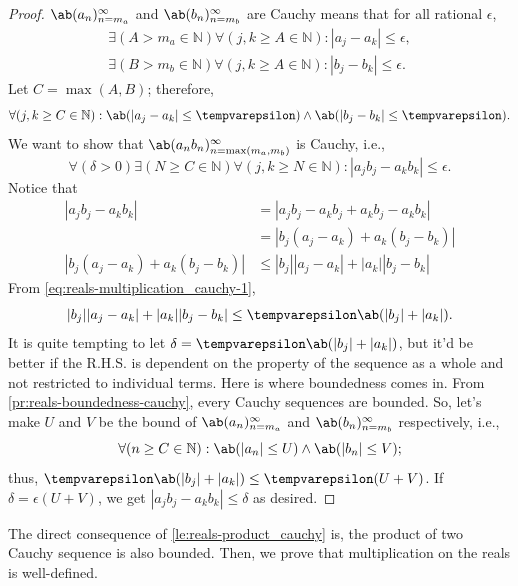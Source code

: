 \begin{proof}
  $\sequence{a_n}{n = m_a}{\infty}$ and $\sequence{b_n}{n = m_b}{\infty}$ are Cauchy
  means that for all rational $\epsilon$,
  \begin{gather}
    \exists (A > m_a \in \mathbb{N}) \forall (j, k \geq A \in \mathbb{N}) : |a_j - a_k| \leq \epsilon, \\
    \exists (B > m_b \in \mathbb{N}) \forall (j, k \geq A \in \mathbb{N}) : |b_j - b_k| \leq \epsilon.
  \end{gather}
  Let $C = \max(A, B)$; therefore,
  \begin{equation}
    \forall (j, k \geq C \in \mathbb{N}) : \ab(|a_j - a_k| \leq \epsilon)
    \land \ab(|b_j - b_k| \leq \epsilon). \label{eq:reals-multiplication_cauchy-1}
  \end{equation}
  We want to show that $\sequence{a_n b_n}{n = \max(m_a, m_b)}{\infty}$ is Cauchy, i.e.,
  \begin{equation}
    \forall (\delta > 0) \exists (N \geq C \in \mathbb{N}) \forall (j, k \geq N \in \mathbb{N}) : |a_j b_j - a_k b_k| \leq \epsilon.
  \end{equation}
  Notice that
  \begin{align}
    |a_j b_j - a_k b_k|                 & = |a_j b_j - a_k b_j + a_k b_j - a_k b_k|  \\
                                        & = |b_j (a_j - a_k) + a_k (b_j - b_k)|      \\
    |b_j (a_j - a_k) + a_k (b_j - b_k)| & \leq |b_j| |a_j - a_k| + |a_k| |b_j - b_k|
  \end{align}
  From \cref{eq:reals-multiplication_cauchy-1},
  \begin{equation}
    |b_j| |a_j - a_k| + |a_k| |b_j - b_k| \leq \epsilon \ab(|b_j| + |a_k|).
  \end{equation}
  It is quite tempting to let $\delta = \epsilon \ab(|b_j| + |a_k|)$, but it'd be better
  if the R.H.S. is dependent on the property of the sequence as a whole and not restricted
  to individual terms. Here is where boundedness comes in. From \cref{pr:reals-boundedness-cauchy},
  every Cauchy sequences are bounded. So, let's make $U$ and $V$ be the bound of
  $\sequence{a_n}{n = m_a}{\infty}$ and $\sequence{b_n}{n = m_b}{\infty}$ respectively, i.e.,
  \begin{equation}
    \forall (n \geq C \in \mathbb{N}) : \ab(|a_n| \leq U) \land \ab(|b_n| \leq V);
  \end{equation}
  thus, $\epsilon \ab(|b_j| + |a_k|) \leq \epsilon (U + V)$. If $\delta = \epsilon (U + V)$,
  we get $|a_j b_j - a_k b_k| \leq \delta$ as desired.
\end{proof}
The direct consequence of \cref{le:reals-product_cauchy} is, the product of two Cauchy
sequence is also bounded. Then, we prove that multiplication on the reals is well-defined.

